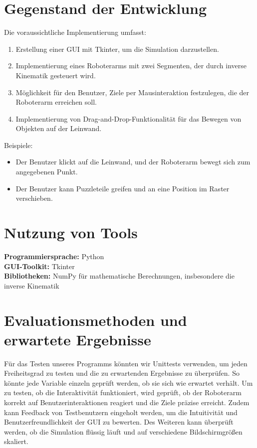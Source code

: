 \documentclass[german,a4paper,pdftex,12pt]{article}
\begin{document}
    \section{Gegenstand der Entwicklung}
    Die voraussichtliche Implementierung umfasst:
    \begin{enumerate}
        \item Erstellung einer GUI mit Tkinter, um die Simulation darzustellen.
        \item Implementierung eines Roboterarms mit zwei Segmenten, der durch inverse Kinematik gesteuert wird.
        \item Möglichkeit für den Benutzer, Ziele per Mausinteraktion festzulegen, die der Roboterarm erreichen soll.
        \item Implementierung von Drag-and-Drop-Funktionalität für das Bewegen von Objekten auf der Leinwand.
    \end{enumerate}

    Beispiele:
    \begin{itemize}
        \item Der Benutzer klickt auf die Leinwand, und der Roboterarm bewegt sich zum angegebenen Punkt.
        \item Der Benutzer kann Puzzleteile greifen und an eine Position im Raster verschieben.
    \end{itemize}

    \section{Nutzung von Tools}
    {\bf Programmiersprache:} Python \\
    {\bf GUI-Toolkit:} Tkinter \\
    {\bf Bibliotheken:} NumPy für mathematische Berechnungen, insbesondere die inverse Kinematik


    \section{Evaluationsmethoden und erwartete Ergebnisse}
    Für das Testen unseres Programms könnten wir Unittests verwenden, um jeden Freiheitsgrad zu testen und die zu erwartenden Ergebnisse zu überprüfen.
    So könnte jede Variable einzeln geprüft werden, ob sie sich wie erwartet verhält.
    Um zu testen, ob die Interaktivität funktioniert, wird geprüft, ob der Roboterarm korrekt auf Benutzerinteraktionen reagiert und die Ziele präzise erreicht.
    Zudem kann Feedback von Testbenutzern eingeholt werden, um die Intuitivität und Benutzerfreundlichkeit der GUI zu bewerten.
    Des Weiteren kann überprüft werden, ob die Simulation flüssig läuft und auf verschiedene Bildschirmgrößen skaliert.
\end{document}
